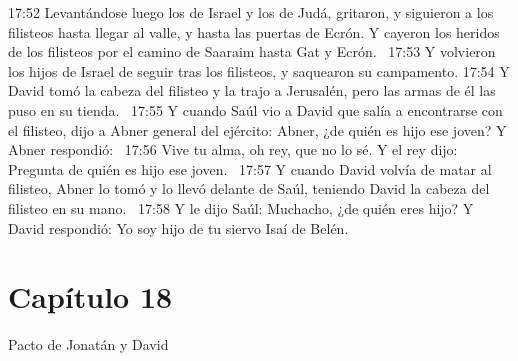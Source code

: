 17:52 Levantándose luego los de Israel y los de Judá, gritaron, y siguieron a los filisteos hasta llegar al valle, y hasta las puertas de Ecrón. Y cayeron los heridos de los filisteos por el camino de Saaraim hasta Gat y Ecrón.  
17:53 Y volvieron los hijos de Israel de seguir tras los filisteos, y saquearon su campamento. 
17:54 Y David tomó la cabeza del filisteo y la trajo a Jerusalén, pero las armas de él las puso en su tienda.  
17:55 Y cuando Saúl vio a David que salía a encontrarse con el filisteo, dijo a Abner general del ejército: Abner, ¿de quién es hijo ese joven? Y Abner respondió:  
17:56 Vive tu alma, oh rey, que no lo sé. Y el rey dijo: Pregunta de quién es hijo ese joven.  
17:57 Y cuando David volvía de matar al filisteo, Abner lo tomó y lo llevó delante de Saúl, teniendo David la cabeza del filisteo en su mano.  
17:58 Y le dijo Saúl: Muchacho, ¿de quién eres hijo? Y David respondió: Yo soy hijo de tu siervo Isaí de Belén.  
\section*{Capítulo 18}
Pacto de Jonatán y David  

